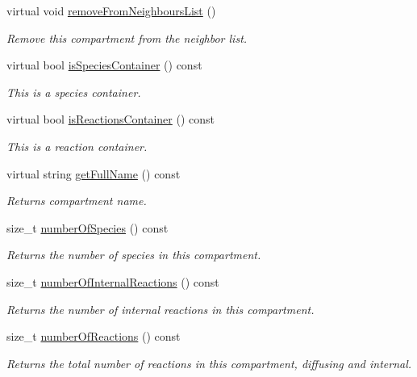 \begin{DoxyCompactItemize}
virtual void \hyperlink{classCompartment_ac81869e9e5c1f744bef1d7ec41e611f7}{remove\+From\+Neighbours\+List} ()
\begin{DoxyCompactList}\small\item\em Remove this compartment from the neighbor list. \end{DoxyCompactList}\item 
virtual bool \hyperlink{classCompartment_ac26aefc0e11a0bf2065626bc47b5de08}{is\+Species\+Container} () const 
\begin{DoxyCompactList}\small\item\em This is a species container. \end{DoxyCompactList}\item 
virtual bool \hyperlink{classCompartment_a87a624dd83cc42e752454645a5484f6e}{is\+Reactions\+Container} () const 
\begin{DoxyCompactList}\small\item\em This is a reaction container. \end{DoxyCompactList}\item 
virtual string \hyperlink{classCompartment_aee4d7b2def05be8e5e75f6744c7b3940}{get\+Full\+Name} () const 
\begin{DoxyCompactList}\small\item\em Returns compartment name. \end{DoxyCompactList}\item 
size\+\_\+t \hyperlink{classCompartment_a9658205238f8d417eb29c5d966026844}{number\+Of\+Species} () const 
\begin{DoxyCompactList}\small\item\em Returns the number of species in this compartment. \end{DoxyCompactList}\item 
size\+\_\+t \hyperlink{classCompartment_a154befbf1b4afd890a90139dbcfc4aab}{number\+Of\+Internal\+Reactions} () const 
\begin{DoxyCompactList}\small\item\em Returns the number of internal reactions in this compartment. \end{DoxyCompactList}\item 
size\+\_\+t \hyperlink{classCompartment_a2a8090f8a6df14b5d8ab528425333cca}{number\+Of\+Reactions} () const 
\begin{DoxyCompactList}\small\item\em Returns the total number of reactions in this compartment, diffusing and internal. \end{DoxyCompactList}\item 

\end{DoxyCompactItemize}
